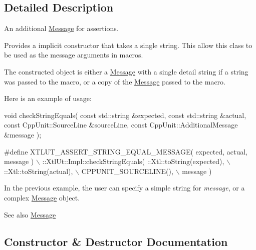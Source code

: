 \subsection{Detailed Description}
An additional \hyperlink{class_message}{Message} for assertions.

Provides a implicit constructor that takes a single string. This allow this class to be used as the message arguments in macros. 

The constructed object is either a \hyperlink{class_message}{Message} with a single detail string if a string was passed to the macro, or a copy of the \hyperlink{class_message}{Message} passed to the macro.

Here is an example of usage\+: 
\begin{DoxyCode}
\textcolor{keywordtype}{void} checkStringEquals( \textcolor{keyword}{const} std::string &expected,
                       \textcolor{keyword}{const} std::string &actual,
                        \textcolor{keyword}{const} CppUnit::SourceLine &sourceLine,
                        \textcolor{keyword}{const} CppUnit::AdditionalMessage &message );

\textcolor{preprocessor}{#define XTLUT\_ASSERT\_STRING\_EQUAL\_MESSAGE( expected, actual, message )  \(\backslash\)}
\textcolor{preprocessor}{  ::XtlUt::Impl::checkStringEquals( ::Xtl::toString(expected),        \(\backslash\)}
\textcolor{preprocessor}{                                    ::Xtl::toString(actual),          \(\backslash\)}
\textcolor{preprocessor}{                                    CPPUNIT\_SOURCELINE(),             \(\backslash\)}
\textcolor{preprocessor}{                                    message )}
\end{DoxyCode}


In the previous example, the user can specify a simple string for {\itshape message}, or a complex \hyperlink{class_message}{Message} object.

\begin{DoxySeeAlso}{See also}
\hyperlink{class_message}{Message} 
\end{DoxySeeAlso}


\subsection{Constructor \& Destructor Documentation}
